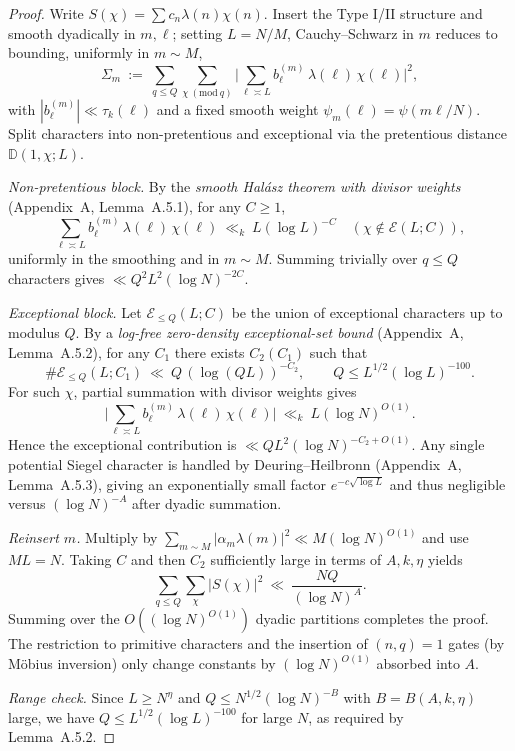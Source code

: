 \documentclass[11pt]{article}
\theoremstyle{definition}
\theoremstyle{remark}
\begin{document}
\begin{proof}
Write $S(\chi)=\sum c_n\lambda(n)\chi(n)$. Insert the Type I/II structure and smooth dyadically in $m,\ell$; setting $L=N/M$, Cauchy–Schwarz in $m$ reduces to bounding, uniformly in $m\sim M$,
\[
\Sigma_m\ :=\ \sum_{q\le Q}\sum_{\chi\ (\mathrm{mod}\ q)}\Big|\sum_{\ell\asymp L} b^{(m)}_\ell\,\lambda(\ell)\,\chi(\ell)\Big|^2,
\]
with $|b^{(m)}_\ell|\ll\tau_k(\ell)$ and a fixed smooth weight $\psi_m(\ell)=\psi(m\ell/N)$. Split characters into non-pretentious and exceptional via the pretentious distance $\mathbb D(1,\chi;L)$.

\emph{Non-pretentious block.} By the \emph{smooth Hal\'asz theorem with divisor weights} (Appendix~A, Lemma~A.5.1), for any $C\ge 1$,
\[
\sum_{\ell\asymp L} b^{(m)}_\ell\,\lambda(\ell)\,\chi(\ell)\ \ll_{k}\ L(\log L)^{-C}
\quad(\chi\notin\mathcal E(L;C)),
\]
uniformly in the smoothing and in $m\sim M$. Summing trivially over $q\le Q$ characters gives $\ll Q^2 L^2(\log N)^{-2C}$.

\emph{Exceptional block.} Let $\mathcal E_{\le Q}(L;C)$ be the union of exceptional characters up to modulus $Q$. By a \emph{log-free zero-density exceptional-set bound} (Appendix~A, Lemma~A.5.2), for any $C_1$ there exists $C_2(C_1)$ such that
\[
\#\mathcal E_{\le Q}(L;C_1)\ \ll\ Q\,(\log (QL))^{-C_2},\qquad Q\le L^{1/2}(\log L)^{-100}.
\]
For such $\chi$, partial summation with divisor weights gives
\[
\Big|\sum_{\ell\asymp L} b^{(m)}_\ell\,\lambda(\ell)\,\chi(\ell)\Big|\ \ll_{k}\ L(\log N)^{O(1)}.
\]
Hence the exceptional contribution is $\ll Q L^2 (\log N)^{-C_2+O(1)}$. Any single potential Siegel character is handled by Deuring–Heilbronn (Appendix~A, Lemma~A.5.3), giving an exponentially small factor $e^{-c\sqrt{\log L}}$ and thus negligible versus $(\log N)^{-A}$ after dyadic summation.

\emph{Reinsert $m$.} Multiply by $\sum_{m\sim M}|\alpha_m\lambda(m)|^2\ll M(\log N)^{O(1)}$ and use $ML=N$. Taking $C$ and then $C_2$ sufficiently large in terms of $A,k,\eta$ yields
\[
\sum_{q\le Q}\sum_{\chi}|S(\chi)|^2\ \ll\ \frac{NQ}{(\log N)^A}.
\]
Summing over the $O((\log N)^{O(1)})$ dyadic partitions completes the proof. The restriction to primitive characters and the insertion of $(n,q)=1$ gates (by M\"obius inversion) only change constants by $(\log N)^{O(1)}$ absorbed into $A$.

\emph{Range check.} Since $L\ge N^{\eta}$ and $Q\le N^{1/2}(\log N)^{-B}$ with $B=B(A,k,\eta)$ large, we have $Q\le L^{1/2}(\log L)^{-100}$ for large $N$, as required by Lemma~A.5.2.
\end{proof}
\end{document}
